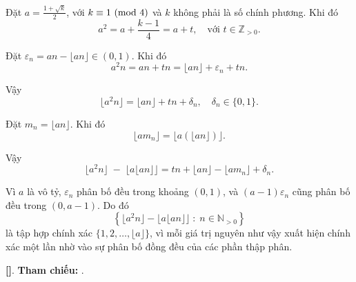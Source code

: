 \documentclass[../03-arithmetic-functions.tex]{subfiles}
\begin{document}
\begin{soln}
    
    Đặt \( a = \frac{1 + \sqrt{k}}{2} \), với \( k \equiv 1 \ (\mathrm{mod}\ 4) \) và \( k \) không phải là số chính phương. Khi đó
    \[
        a^2 = a + \frac{k - 1}{4} = a + t, \quad \text{với } t \in \mathbb{Z}_{>0}.
    \]
    
    Đặt \( \varepsilon_n = a n - \lfloor a n \rfloor \in (0,1) \). Khi đó
    \[
        a^2 n = a n + t n = \lfloor a n \rfloor + \varepsilon_n + t n.
    \]
    
    Vậy
    \[
        \lfloor a^2 n \rfloor = \lfloor a n \rfloor + t n + \delta_n, \quad \delta_n \in \{0,1\}.
    \]

    Đặt \( m_n = \lfloor a n \rfloor \). Khi đó
    \[
        \lfloor a m_n \rfloor = \lfloor a (\lfloor a n \rfloor) \rfloor.
    \]
    
    Vậy
    \[
        \lfloor a^2 n \rfloor \;-\; \lfloor a \lfloor a n \rfloor \rfloor 
        = t n + \lfloor a n \rfloor - \lfloor a m_n \rfloor + \delta_n.
    \]
    
    Vì \( a \) là vô tỷ, \( \varepsilon_n \) phân bố đều trong khoảng \( (0,1) \), và \((a - 1)\varepsilon_n\) cũng phân bố đều trong \( (0, a - 1) \).  
    Do đó
    \[
        \left\{ 
            \lfloor a^2 n \rfloor - \lfloor a \lfloor a n \rfloor \rfloor 
            \;:\; n \in \mathbb{N}_{>0} 
        \right\}
    \]
    là tập hợp chính xác \(\{1, 2, \ldots, \lfloor a \rfloor\}\), vì mỗi giá trị nguyên như vậy xuất hiện chính xác một lần nhờ vào sự phân bố đồng đều của các phần thập phân.

    \vspace{1em}
    \textbf{[]}.
    \textbf{Tham chiếu:} .
\end{soln}
\end{document}
